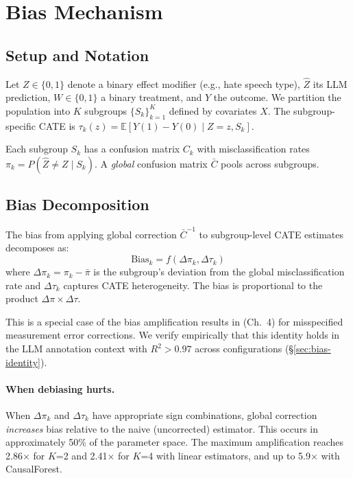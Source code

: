 \documentclass[11pt]{article}
\begin{document}
\section{Bias Mechanism}
\label{sec:method}

\subsection{Setup and Notation}

Let $Z \in \{0,1\}$ denote a binary effect modifier (e.g., hate speech type), $\hat{Z}$ its LLM prediction, $W \in \{0,1\}$ a binary treatment, and $Y$ the outcome.
We partition the population into $K$ subgroups $\{S_k\}_{k=1}^K$ defined by covariates $X$.
The subgroup-specific CATE is $\tau_k(z) = \mathbb{E}[Y(1) - Y(0) \mid Z=z, S_k]$.

Each subgroup $S_k$ has a confusion matrix $C_k$ with misclassification rates $\pi_k = P(\hat{Z} \neq Z \mid S_k)$.
A \emph{global} confusion matrix $\bar{C}$ pools across subgroups.

\subsection{Bias Decomposition}
\label{sec:bias-decomp}

The bias from applying global correction $\bar{C}^{-1}$ to subgroup-level CATE estimates decomposes as:
\begin{equation}
\text{Bias}_k = f(\Delta\pi_k, \Delta\tau_k)
\label{eq:bias-identity}
\end{equation}
where $\Delta\pi_k = \pi_k - \bar{\pi}$ is the subgroup's deviation from the global misclassification rate and $\Delta\tau_k$ captures CATE heterogeneity.
The bias is proportional to the product $\Delta\pi \times \Delta\tau$.

This is a special case of the bias amplification results in \citet{carroll2006measurement} (Ch.~4) for misspecified measurement error corrections.
We verify empirically that this identity holds in the LLM annotation context with $R^2 > 0.97$ across configurations (\S\ref{sec:bias-identity}).

\paragraph{When debiasing hurts.}
When $\Delta\pi_k$ and $\Delta\tau_k$ have appropriate sign combinations, global correction \emph{increases} bias relative to the naive (uncorrected) estimator.
This occurs in approximately 50\% of the parameter space.
The maximum amplification reaches 2.86$\times$ for $K$=2 and 2.41$\times$ for $K$=4 with linear estimators, and up to 5.9$\times$ with CausalForest.
\end{document}
